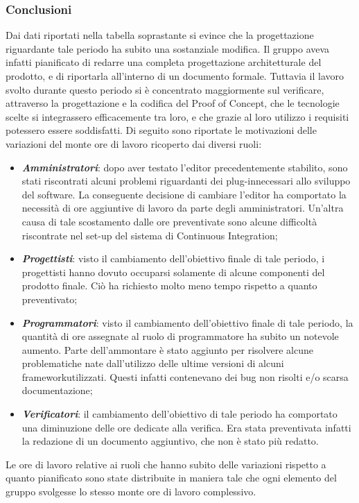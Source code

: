 \subsubsection{Conclusioni}
Dai dati riportati nella tabella soprastante si evince che la progettazione riguardante tale periodo ha subito una sostanziale modifica. Il gruppo aveva infatti pianificato di redarre una completa progettazione architetturale del prodotto, e di riportarla all'interno di un documento formale. Tuttavia il lavoro svolto durante questo periodo si è concentrato maggiormente sul verificare, attraverso la progettazione e la codifica del Proof of Concept\glo, che le tecnologie scelte si integrassero efficacemente tra loro, e che grazie al loro utilizzo i requisiti potessero essere soddisfatti. Di seguito sono riportate le motivazioni delle variazioni del monte ore di lavoro ricoperto dai diversi ruoli:

\begin{itemize}
	\item \textbf{\textit{Amministratori}}: dopo aver testato l'editor precedentemente stabilito, sono stati riscontrati alcuni problemi riguardanti dei plug-in\glosp necessari allo sviluppo del software. La conseguente decisione di cambiare l'editor ha comportato la necessità di ore aggiuntive di lavoro da parte degli amministratori. Un'altra causa di tale scostamento dalle ore preventivate sono alcune difficoltà riscontrate nel set-up del sistema di Continuous Integration\glo;
	\item \textbf{\textit{Progettisti}}: visto il cambiamento dell'obiettivo finale di tale periodo, i progettisti hanno dovuto occuparsi solamente di alcune componenti del prodotto finale. Ciò ha richiesto molto meno tempo rispetto a quanto preventivato;
	\item \textbf{\textit{Programmatori}}: visto il cambiamento dell'obiettivo finale di tale periodo, la quantità di ore assegnate al ruolo di programmatore ha subito un notevole aumento. Parte dell'ammontare è stato aggiunto per risolvere alcune problematiche nate dall'utilizzo delle ultime versioni di alcuni framework\glosp utilizzati. Questi infatti contenevano dei bug non risolti e/o scarsa documentazione;
	\item \textbf{\textit{Verificatori}}: il cambiamento dell'obiettivo di tale periodo ha comportato una diminuzione delle ore dedicate alla verifica. Era stata preventivata infatti la redazione di un documento aggiuntivo, che non è stato più redatto.
\end{itemize}
Le ore di lavoro relative ai ruoli che hanno subito delle variazioni rispetto a quanto pianificato sono state distribuite in maniera tale che ogni elemento del gruppo svolgesse lo stesso monte ore di lavoro complessivo.
